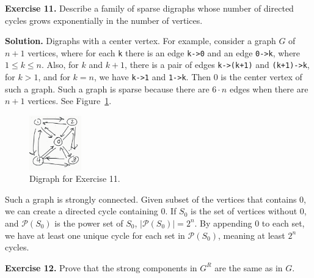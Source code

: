 \documentclass[12pt, a4paper]{article}
\newenvironment{ex}[2][Exercise]
{\par\medskip\noindent \textbf{#1 #2.}}
{\medskip}
\newenvironment{sol}[1][Solution]
{\par\medskip\noindent \textbf{#1.} }
{\medskip}
\begin{document}
	\begin{ex}{11}
		Describe a family of sparse digraphs whose number of directed cycles grows
		exponentially in the number of vertices.
	\end{ex}
	\begin{sol}
		Digraphs with a center vertex. For example, consider a graph $G$ of $n+1$
		vertices, where for each \texttt{k} there is an edge \texttt{k->0}
		and an edge \texttt{0->k}, where $1\leq k\leq n$. Also, for $k$ and
		$k+1$, there is a pair of edges \texttt{k->(k+1)} and \texttt{(k+1)->k},
		for $k>1$, and for $k=n$, we have \texttt{k->1} and \texttt{1->k}.
		Then $0$ is the center vertex of such a graph. Such a graph is sparse
		because there are $6\cdot n$ edges when there are $n+1$ vertices.
		See Figure~\ref{fig:ex-11}.
		
		\begin{figure}
			\centering
			\includegraphics[width=0.2\textwidth]{exercise-11}
			\caption{Digraph for Exercise 11.}
			\label{fig:ex-11}
		\end{figure}
		
		Such a graph is strongly connected. Given subset of the vertices that contains
		$0$, we can create a directed cycle containing $0$. If $S_0$ is the set of
		vertices without $0$, and $\mathcal{P}(S_0)$ is the power set of $S_0$,
		$|\mathcal{P}(S_0)|=2^n$. By appending $0$ to each set, we have at least
		one unique cycle for each set in $\mathcal{P}(S_0)$, meaning at least $2^n$
		cycles.
	\end{sol}
	\begin{ex}{12}
		Prove that the strong components in $G^R$ are the same as in $G$.
	\end{ex}
\end{document}
